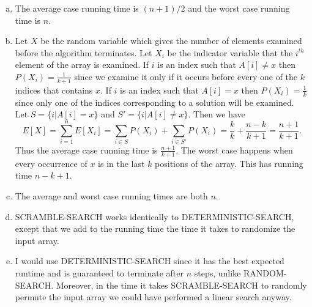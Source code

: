 \documentclass{article}
\begin{document}
\begin{enumerate}[a.]
\item The average case running time is $(n+1)/2$ and the worst case running time is $n$. \\

\item Let $X$ be the random variable which gives the number of elements examined before the algorithm terminates.  Let $X_i$ be the indicator variable that the $i^{th}$ element of the array is examined.  If $i$ is an index such that $A[i] \neq x$ then $P(X_i) = \frac{1}{k+1}$ since we examine it only if it occurs before every one of the $k$ indices that contains $x$.  If $i$ is an index such that $A[i] = x$ then $P(X_i) = \frac{1}{k}$ since only one of the indices corresponding to a solution will be examined.  Let $S = \{i | A[i] = x\}$ and $S' = \{i | A[i] \neq x\}$.  Then we have
\[E[X] = \sum_{i=1}^n E[X_i] = \sum_{i \in S} P(X_i) + \sum_{i \in S'}P(X_i) = \frac{k}{k} + \frac{n-k}{k+1} = \frac{n+1}{k+1}.\]
Thus the average case running time is $\frac{n+1}{k+1}$.  The worst case happens when every occurrence of $x$ is in the last $k$ positions of the array.  This has running time $n-k+1$.\\

\item The average and worst case running times are both $n$. \\

\item SCRAMBLE-SEARCH works identically to DETERMINISTIC-SEARCH, except that we add to the running time the time it takes to randomize the input array. \\

\item I would use DETERMINISTIC-SEARCH since it has the best expected runtime and is guaranteed to terminate after $n$ steps, unlike RANDOM-SEARCH.  Moreover, in the time it takes SCRAMBLE-SEARCH to randomly permute the input array we could have performed a linear search anyway.
\end{enumerate}
\end{document}
